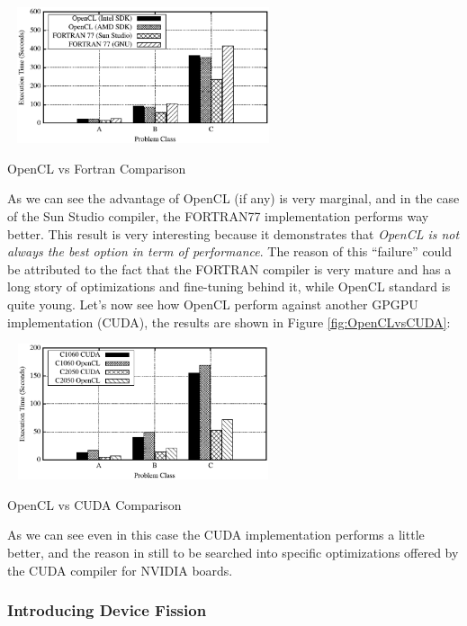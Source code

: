\begin{figurehere}
 \centering
 \includegraphics[width=8cm, height=4cm]{./eps/OpenCLvsFORTRAN77.eps}
 \caption{OpenCL vs Fortran Comparison}
 \label{fig:OpenCLvsFORTRAN77}
\end{figurehere}

As we can see the advantage of OpenCL (if any) is very marginal, and in the case of the Sun Studio compiler, the FORTRAN77 implementation performs way better. This result is very interesting because it demonstrates that \emph{OpenCL is not always the best option in term of performance}. The reason of this ``failure'' could be attributed to the fact that the FORTRAN compiler is very mature and has a long story of optimizations and fine-tuning behind it, while OpenCL standard is quite young.
Let's now see how OpenCL perform against another GPGPU implementation (CUDA), the results are shown in Figure \ref{fig:OpenCLvsCUDA}:

\begin{figurehere}
 \centering
 \includegraphics[width=8cm, height=4cm]{./eps/OpenCLvsCUDA.eps}
 \caption{OpenCL vs CUDA Comparison}
 \label{fig:OpenCLvsCUDA}
\end{figurehere}

As we can see even in this case the CUDA implementation performs a little better, and the reason in still to be searched into specific optimizations offered by the CUDA compiler for NVIDIA boards.

\subsubsection{Introducing Device Fission}








